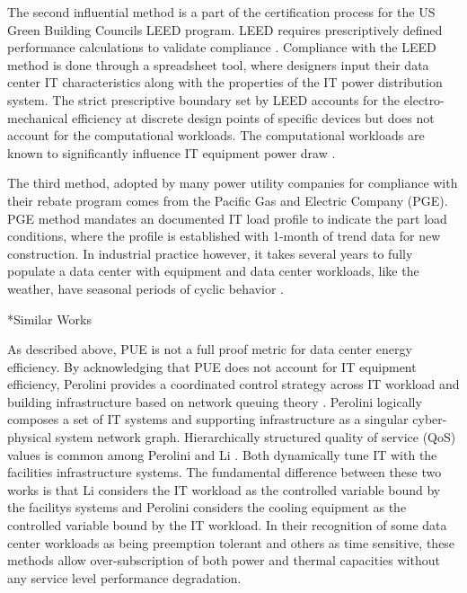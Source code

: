 \documentclass[twocolumn, a4paper,10pt]{article}
\makeatletter
\renewcommand\section{\@startsection{section}{1}{\z@}{0.25cm}{0.1cm}{\normalfont\large\bfseries}}
\makeatother
\begin{document}
The second influential method is a part of the certification process for the US Green Building Council\textsc{}s LEED program. LEED requires prescriptively defined performance calculations to validate compliance \citep{LEED16}. Compliance with the LEED method is done through a spreadsheet tool, where designers input their data center IT characteristics along with the properties of the IT power distribution system. The strict prescriptive boundary set by LEED accounts for the electro-mechanical efficiency at discrete design points of specific devices but does not account for the computational workloads. The computational workloads are known to significantly influence IT equipment power draw \citep{marculescu20}.  

The third method, adopted by many power utility companies for compliance with their rebate program comes from the Pacific Gas and Electric Company (PGE). PGE method mandates an documented IT load profile to indicate the part load conditions, where the profile is established with 1-month of trend data for new construction. In industrial practice however, it takes several years to fully populate a data center with equipment and data center workloads, like the weather, have seasonal periods of cyclic behavior \citep{zhuang15}.

\section*{Similar Works}

As described above, PUE is not a full proof metric for data center energy efficiency. By acknowledging that PUE does not account for IT equipment efficiency, Perolini provides a coordinated control strategy across IT workload and building infrastructure based on network queuing theory \citep{parolini12}. Perolini logically composes a set of IT systems and supporting infrastructure as a singular cyber-physical system network graph. Hierarchically structured quality of service (QoS) values is common among Perolini and Li \citep{Li18}. Both dynamically tune IT with the facilities infrastructure systems. The fundamental difference between these two works is that Li considers the IT workload as the controlled variable bound by the facility\textsc{}s systems and Perolini considers the cooling equipment as the controlled variable bound by the IT workload. In their recognition of some data center workloads as being preemption tolerant and others as time sensitive, these methods allow over-subscription of both power and thermal capacities without any service level performance degradation. 
\end{document}
